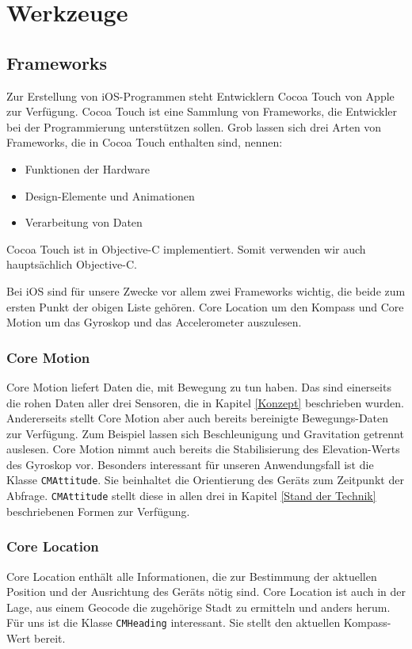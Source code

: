 \section{Werkzeuge}

\subsection{Frameworks}
Zur Erstellung von iOS-Programmen steht Entwicklern Cocoa Touch von Apple zur Verfügung. Cocoa Touch ist eine Sammlung von Frameworks, die Entwickler bei der Programmierung unterstützen sollen. Grob lassen sich drei Arten von Frameworks, die in Cocoa Touch enthalten sind, nennen:

\begin{itemize}
\item Funktionen der Hardware
\item Design-Elemente und Animationen
\item Verarbeitung von Daten
\end{itemize}

Cocoa Touch ist in Objective-C implementiert. Somit verwenden wir auch hauptsächlich Objective-C. \cite{apple:002}

Bei iOS sind für unsere Zwecke vor allem zwei Frameworks wichtig, die beide zum ersten Punkt der obigen Liste gehören. Core Location um den Kompass und Core Motion um das Gyroskop und das Accelerometer auszulesen.\\

\subsubsection{Core Motion}
Core Motion liefert Daten die, mit Bewegung zu tun haben. Das sind einerseits die rohen Daten aller drei Sensoren, die in Kapitel \ref{Konzept} beschrieben wurden. Andererseits stellt Core Motion aber auch bereits bereinigte Bewegungs-Daten zur Verfügung. Zum Beispiel lassen sich Beschleunigung und Gravitation getrennt auslesen. Core Motion nimmt auch bereits die Stabilisierung des Elevation-Werts des Gyroskop vor. Besonders interessant für unseren Anwendungsfall ist die Klasse \texttt{CMAttitude}. Sie beinhaltet die Orientierung des Geräts zum Zeitpunkt der Abfrage. \texttt{CMAttitude} stellt diese in allen drei in Kapitel \ref{Stand der Technik} beschriebenen Formen zur Verfügung.

\subsubsection{Core Location}
Core Location enthält alle Informationen, die zur Bestimmung der aktuellen Position und der Ausrichtung des Geräts nötig sind. Core Location ist auch in der Lage, aus einem Geocode die zugehörige Stadt zu ermitteln und anders herum. Für uns ist die Klasse \texttt{CMHeading} interessant. Sie stellt den aktuellen Kompass-Wert bereit.

